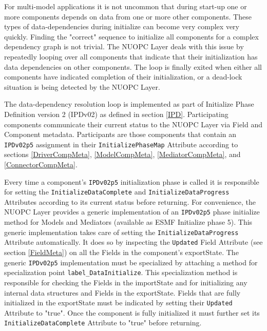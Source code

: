 %

\label{DataDepInit}

For multi-model applications it is not uncommon that during start-up one or more components depends on data from one or more other components. These types of data-dependencies during initialize can become very complex very quickly. Finding the "correct" sequence to initialize all components for a complex dependency graph is not trivial. The NUOPC Layer deals with this issue by repeatedly looping over all components that indicate that their initialization has data dependencies on other components. The loop is finally exited when either all components have indicated completion of their initialization, or a dead-lock situation is being detected by the NUOPC Layer.

The data-dependency resolution loop is implemented as part of Initialize Phase Definition version 2 (IPDv02) as defined in section \ref{IPD}. Participating components communicate their current status to the NUOPC Layer via Field and Component metadata. Participants are those components that contain an {\tt IPDv02p5} assignment in their {\tt InitializePhaseMap} Attribute according to sections \ref{DriverCompMeta}, \ref{ModelCompMeta}, \ref{MediatorCompMeta}, and \ref{ConnectorCompMeta}. 

Every time a component's {\tt IPDv02p5} initialization phase is called it is responsible for setting the {\tt InitializeDataComplete} and {\tt InitializeDataProgress} Attributes according to its current status before returning. For convenience, the NUOPC Layer provides a generic implementation of an {\tt IPDv02p5} phase initialize method for Models and Mediators (available as ESMF Initialize phase 5). This generic implementation takes care of setting the {\tt InitializeDataProgress} Attribute automatically. It does so by inspecting the {\tt Updated} Field Attribute (see section \ref{FieldMeta}) on all the Fields in the component's exportState. The generic {\tt IPDv02p5} implementation must be specialized by attaching a method for specialization point {\tt label\_DataInitialize}. This specialization method is responsible for checking the Fields in the importState and for initializing any internal data structures and Fields in the exportState. Fields that are fully initialized in the exportState must be indicated by setting their {\tt Updated} Attribute to "true". Once the component is fully initialized it must further set its {\tt InitializeDataComplete} Attribute to "true" before returning.

